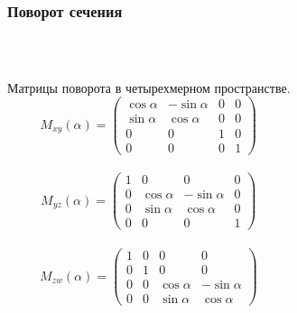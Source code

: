 \documentclass[10pt,pdf,hyperref={unicode}]{beamer}
\begin{document}
\begin{frame}
	\frametitle{Поворот сечения}	\\

	\begin{columns}
	\begin{block}{Матрицы поворота в четырехмерном пространстве.}
		{\footnotesize
			$$
			M_{xy}(\alpha)=
			\left(
			\begin{array}{cccc}
				\cos \alpha & -\sin \alpha & 0 & 0 \\
				\sin \alpha & \cos \alpha & 0 & 0 \\
				0 & 0 & 1 & 0 \\
				0 & 0 & 0 & 1
			\end{array}\right)
			$$			\\
			
			\newline
			$$
			M_{yz}(\alpha)=
			\left(
			\begin{array}{cccc}
				1 & 0 & 0 & 0 \\
				0 & \cos \alpha & -\sin \alpha & 0 \\
				0 & \sin \alpha & \cos \alpha & 0 \\
				0 & 0 & 0 & 1
			\end{array}\right)
			$$			\\ 

			$$
			M_{zw}(\alpha)=
			\left(
			\begin{array}{cccc}
				1 & 0 & 0 & 0 \\
				0 & 1 & 0 & 0 \\
				0 & 0 & \cos \alpha & -\sin \alpha \\
				0 & 0 & \sin \alpha & \cos \alpha
			\end{array}\right)
			$$
		}

\end{block}
\end{columns}
\end{frame}
\end{document}
